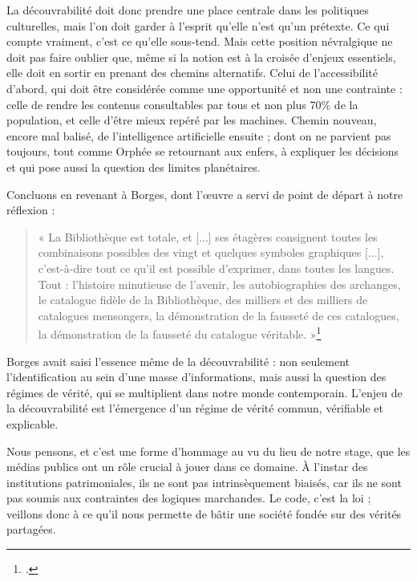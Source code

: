 \documentclass[a4paper,12pt,twoside]{book}
\begin{document}
	La découvrabilité doit donc prendre une place centrale dans les politiques culturelles, mais l’on doit garder à l’esprit qu’elle n’est qu’un prétexte. Ce qui compte vraiment, c’est ce qu’elle sous-tend. Mais cette position névralgique ne doit pas faire oublier que, même si la notion est à la croisée d’enjeux essentiels, elle doit en sortir en prenant des chemins alternatifs. Celui de l’accessibilité d’abord, qui doit être considérée comme une opportunité et non une contrainte : celle de rendre les contenus consultables par tous et non plus 70\% de la population, et celle d’être mieux repéré par les machines. Chemin nouveau, encore mal balisé, de l’intelligence artificielle ensuite ; dont on ne parvient pas toujours, tout comme Orphée se retournant aux enfers, à expliquer les décisions et qui pose aussi la question des limites planétaires.
	
	Concluons en revenant à Borges, dont l'œuvre a servi de point de départ à notre réflexion :
	
	\begin{quote} « La Bibliothèque est totale, et [...] ses étagères consignent toutes les combinaisons possibles des vingt et quelques symboles graphiques [...], c’est-à-dire tout ce qu’il est possible d’exprimer, dans toutes les langues. Tout : l’histoire minutieuse de l’avenir, les autobiographies des archanges, le catalogue fidèle de la Bibliothèque, des milliers et des milliers de catalogues mensongers, la démonstration de la fausseté de ces catalogues, la démonstration de la fausseté du catalogue véritable. »\footcite[p. 3]{borges1963} \end{quote}
	
	Borges avait saisi l'essence même de la découvrabilité : non seulement l'identification au sein d'une masse d'informations, mais aussi la question des régimes de vérité, qui se multiplient dans notre monde contemporain. L'enjeu de la découvrabilité est l'émergence d'un régime de vérité commun, vérifiable et explicable.
	
	Nous pensons, et c'est une forme d'hommage au vu du lieu de notre stage, que les médias publics ont un rôle crucial à jouer dans ce domaine. À l'instar des institutions patrimoniales, ils ne sont pas intrinsèquement biaisés, car ils ne sont pas soumis aux contraintes des logiques marchandes. Le code, c'est la loi ; veillons donc à ce qu'il nous permette de bâtir une société fondée sur des vérités partagées.
	
	\newpage{\pagestyle{empty}\cleardoublepage}
	
\end{document}
